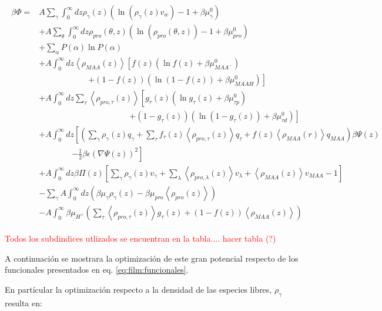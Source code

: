 \begin{align}
	\begin{aligned}
		\beta \Phi=  & A\sum_{\gamma}\int_0^\infty{dz\rho_\gamma(z)\left(\ln \left(\rho_\gamma (z)v_w\right) -1 + \beta\mu^0_\gamma\right)} \\
		&+ A\sum_{\theta}\int_0^\infty{dz\rho_{pro}(\theta,z)\left(\ln \left(\rho_{pro}(\theta,z)\right) -1 + \beta\mu^0_{pro} \right)} \\
		&+ \sum_\alpha{P(\alpha)\ln P(\alpha)} \\
		& + A\int_0^\infty dz \left<\rho_{MAA}(z)\right> \left[f(z)(\ln f(z)+ \beta\mu^0_{MAA^-})\right.\\
		& \qquad\qquad\qquad \left.+(1-f(z))(\ln (1-f(z))+\beta\mu^0_{MAAH})\right] \\
		& + A\int_0^\infty dz \sum_\tau \left<\rho_{pro,\tau}(z)\right> \left[g_\tau(z)(\ln g_\tau(z)+ \beta\mu^0_{\tau p})\right.\\
		&\qquad \qquad \qquad\qquad \qquad\quad \left.+(1-g_\tau(z))(\ln (1-g_\tau(z))+\beta\mu^0_{\tau d})\right]   \\
		& +A\int_0^\infty dz \left[\left(\sum_{\gamma } {\rho_\gamma(z) q_\gamma + \sum_\tau{f_\tau(z) \left<\rho_{pro,\tau}(z)\right> q_\tau} +  f(z) \left<\rho_{MAA}(r)\right>q_{MAA}}\right)\beta\Psi(z) \right. \\ & \qquad \qquad \left.-\frac{1}{2}\beta\epsilon(\nabla\Psi(z))^2 \right] \\ 
		& +A \int_0^\infty dz\beta\Pi(z){\left[\sum_{\gamma}\rho_\gamma(z) v_\gamma + \sum_\lambda{\left<\rho_{pro,\lambda}(z)\right>v_\lambda} + \left<\rho_{MAA}(z)\right>v_{MAA} -1 \right]} \\
		&   -\sum_\gamma A\int_0^\infty dz \left(\beta \mu_\gamma \rho_\gamma(z) - \beta \mu_{pro} \left<\rho_{pro}(z)\right> \right)  \\
		&  -A\int_0^\infty \beta\mu_{H^+} \left( \sum_\tau\left< \rho_{pro,\tau}(z) \right>g_\tau(z) + (1-f(z)) \left< \rho_{MAA}(z) \right> \right )
	\end{aligned}
\end{align}
 
\textcolor{red}{Todos los subdindices utlizados se encuentran en la tabla.... hacer tabla (?)}

A continuaci\'on se mostrara la optimizaci\'on de este gran potencial respecto de los funcionales presentados en  eq. \ref{eq:film:funcionales}.

En part\'icular la optimizaci\'on respecto a la densidad de las especies libres, $\rho_\gamma$ resulta en:

